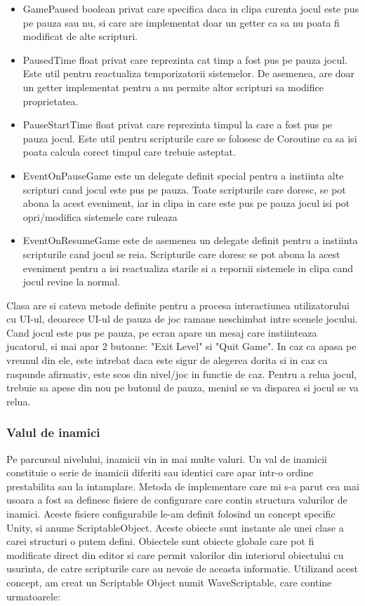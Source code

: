 \documentclass[12pt, a4paper]{article}
\begin{document}
	\begin{itemize}
		\item GamePaused boolean privat care specifica daca in clipa curenta jocul este pus pe pauza sau nu, si care are implementat doar un getter ca sa nu poata fi modificat de alte scripturi.
		\item PausedTime float privat care reprezinta cat timp a fost pus pe pauza jocul. Este util pentru reactualiza temporizatorii sistemelor. De asemenea, are doar un getter implementat pentru a nu permite altor scripturi sa modifice proprietatea.
		\item PauseStartTime float privat care reprezinta timpul la care a fost pus pe pauza jocul. Este util pentru scripturile care se folosesc de Coroutine ca sa isi poata calcula corect timpul care trebuie asteptat.
		\item EventOnPauseGame este un delegate definit special pentru a instiinta alte scripturi cand jocul este pus pe pauza. Toate scripturile care doresc, se pot abona la acest eveniment, iar in clipa in care este pus pe pauza jocul isi pot opri/modifica sistemele care ruleaza
		\item EventOnResumeGame este de asemenea un delegate definit pentru a instiinta scripturile cand jocul se reia. Scripturile care doresc se pot abona la acest eveniment pentru a isi reactualiza starile si a repornii sistemele in clipa cand jocul revine la normal.
	\end{itemize}

	Clasa are si cateva metode definite pentru a procesa interactiunea utilizatorului cu UI-ul, deoarece UI-ul de pauza de joc ramane neschimbat intre scenele jocului. Cand jocul este pus pe pauza, pe ecran apare un mesaj care instiinteaza jucatorul, si mai apar 2 butoane: "Exit Level" si "Quit Game". In caz ca apasa pe vreunul din ele, este intrebat daca este sigur de alegerea dorita si in caz ca raspunde afirmativ, este scos din nivel/joc in functie de caz. Pentru a relua jocul, trebuie sa apese din nou pe butonul de pauza, meniul se va disparea si jocul se va relua.
	
	\subsubsection{Valul de inamici}
	
	Pe parcursul nivelului, inamicii vin in mai multe valuri. Un val de inamicii constituie o serie de inamicii diferiti sau identici care apar intr-o ordine prestabilita sau la intamplare. Metoda de implementare care mi s-a parut cea mai usoara a fost sa definesc fisiere de configurare care contin structura valurilor de inamici. Aceste fisiere configurabile le-am definit folosind un concept specific Unity, si anume ScriptableObject. Aceste obiecte sunt instante ale unei clase a carei structuri o putem defini. Obiectele sunt obiecte globale care pot fi modificate direct din editor si care permit valorilor din interiorul obiectului cu usurinta, de catre scripturile care au nevoie de aceasta informatie. Utilizand acest concept, am creat un Scriptable Object numit WaveScriptable, care contine urmatoarele:
	
\end{document}
